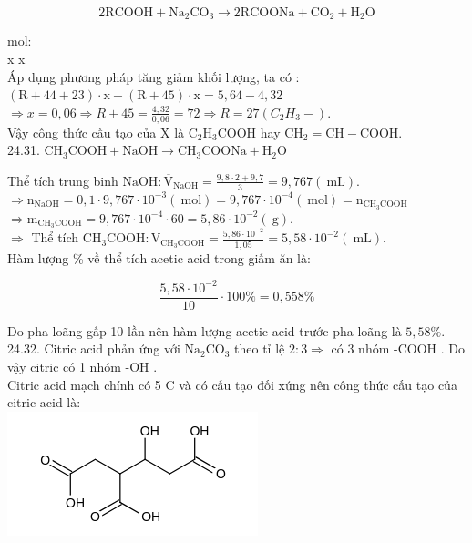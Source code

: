 \documentclass[10pt]{article}
\begin{document}
$$
2 \mathrm{RCOOH}+\mathrm{Na}_{2} \mathrm{CO}_{3} \rightarrow 2 \mathrm{RCOONa}+\mathrm{CO}_{2}+\mathrm{H}_{2} \mathrm{O}
$$

mol:\\
x x\\
Áp dụng phương pháp tăng giảm khối lượng, ta có :\\
$(\mathrm{R}+44+23) \cdot \mathrm{x}-(\mathrm{R}+45) \cdot \mathrm{x}=5,64-4,32$\\
$\Rightarrow x=0,06 \Rightarrow R+45=\frac{4,32}{0,06}=72 \Rightarrow R=27\left(C_{2} H_{3}-\right)$.\\
Vậy công thức cấu tạo của X là $\mathrm{C}_{2} \mathrm{H}_{3} \mathrm{COOH}$ hay $\mathrm{CH}_{2}=\mathrm{CH}-\mathrm{COOH}$.\\
24.31. $\mathrm{CH}_{3} \mathrm{COOH}+\mathrm{NaOH} \rightarrow \mathrm{CH}_{3} \mathrm{COONa}+\mathrm{H}_{2} \mathrm{O}$

Thể tích trung binh $\mathrm{NaOH}: \overline{\mathrm{V}}_{\mathrm{NaOH}}=\frac{9,8 \cdot 2+9,7}{3}=9,767(\mathrm{~mL})$.\\
$\Rightarrow \mathrm{n}_{\mathrm{NaOH}}=0,1 \cdot 9,767 \cdot 10^{-3}(\mathrm{~mol})=9,767 \cdot 10^{-4}(\mathrm{~mol})=\mathrm{n}_{\mathrm{CH}_{3} \mathrm{COOH}}$\\
$\Rightarrow \mathrm{m}_{\mathrm{CH}_{3} \mathrm{COOH}}=9,767 \cdot 10^{-4} \cdot 60=5,86 \cdot 10^{-2}(\mathrm{~g})$.\\
$\Rightarrow$ Thể tích $\mathrm{CH}_{3} \mathrm{COOH}: \mathrm{V}_{\mathrm{CH}_{3} \mathrm{COOH}}=\frac{5,86 \cdot 10^{-2}}{1,05}=5,58 \cdot 10^{-2}(\mathrm{~mL})$.\\
Hàm lượng \% về thể tích acetic acid trong giấm ăn là:

$$
\frac{5,58 \cdot 10^{-2}}{10} \cdot 100 \%=0,558 \%
$$

Do pha loãng gấp 10 lần nên hàm lượng acetic acid trước pha loãng là $5,58 \%$.\\
24.32. Citric acid phản ứng với $\mathrm{Na}_{2} \mathrm{CO}_{3}$ theo tỉ lệ $2: 3 \Rightarrow$ có 3 nhóm -COOH . Do vậy citric có 1 nhóm -OH .\\
Citric acid mạch chính có 5 C và có cấu tạo đối xứng nên công thức cấu tạo của citric acid là:\\
\includegraphics{smile-41d28b2e520a983625bc961984ef816b6c21fbb0}
\end{document}
